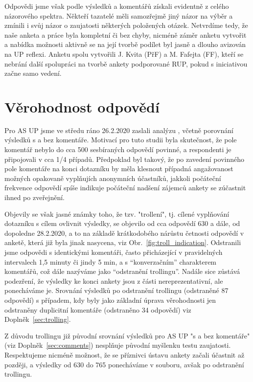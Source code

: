 \documentclass[a4paper,twoside]{article}
\begin{document}
Odpovědi jsme však podle výsledků a komentářů získali evidentně z celého názorového spektra. Někteří tazatelé měli samozřejmě jiný názor na výběr a zmínili i svůj názor o zaujatosti některých položených otázek. Netvrdíme tedy, že naše anketa a práce byla kompletní či bez chyby, nicméně záměr anketu vytvořit a nabídka možnosti aktivně se na její tvorbě podílet byl jasně a dlouho avizován na UP reflexi. Anketu spolu vytvořili J. Kvita (PřF) a M. Fafejta (FF), kteří se nebrání další spolupráci na tvorbě ankety podporované RUP, pokud s iniciativou začne samo vedení.


\section{Věrohodnost odpovědí}
\label{sec:Sel}
Pro AS UP jsme ve středu ráno 26.2.2020 zaslali analýzu , včetně porovnání výsledků s a bez komentáře.
Motivací pro tuto studii byla skutečnost, že pole komentář nebylo do cca 500 sesbíraných odpovědí povinné, a respondenti je připojovali v cca 1/4 případů. Předpoklad byl takový, že po zavedení povinného pole komentáře na konci dotazníku by měla klesnout případná angažovanost možných opakovaně vyplňujích anonymních účastníků, jakkoli počáteční frekvence odpovědí spíše indikuje počáteční nadšení zájemců ankety se zúčastnit ihned po zveřejnění. 

Objevily se však jasné známky toho, že tzv. "trollení", tj. cílené vyplňování dotazníku s cílem ovlivnit výsledky, se objevilo od cca odpovědí 630 a dále, od dopoledne 28.2.2020, a to na základě krátkodobého nárůstu četnosti odpovědí v anketě, která již byla jinak nasycena, viz Obr.~\ref{fig:troll_indication}. Odstranili jsme odpovědi s identickými komentáři, často přicházející v pravidelných intervalech 1,5 minuty či jindy 5 min, a s ``konverzačním'' charakterem komentářů, což dále nazýváme jako ``odstranění trollingu''. Nadále sice zůstává podezření, že výsledky ke konci ankety jsou z části nereprezentativní, ale ponecháváme je. Srovnání výsledků po odstranění trollingu (odstraněné 87 odpovědí) s případem, kdy byly jako základní úprava věrohodnosti jen odstraněny duplicitní komentáře (odstraněno 34 odpovědí) viz Doplněk~\ref{sec:trolling}.

Z důvodu trollingu již původní srovnání výsledků pro AS UP "s a bez komentáře" (viz Doplněk~\ref{sec:comments}) nesplňuje původní myšlenku testu zaujatosti. Respektujeme nicméně možnost, že se příznivci ústavu ankety začali účastnit až později, a výsledky od 630 do 765 ponecháváme v souboru, avšak po odstranění trollingu. 
\end{document}
